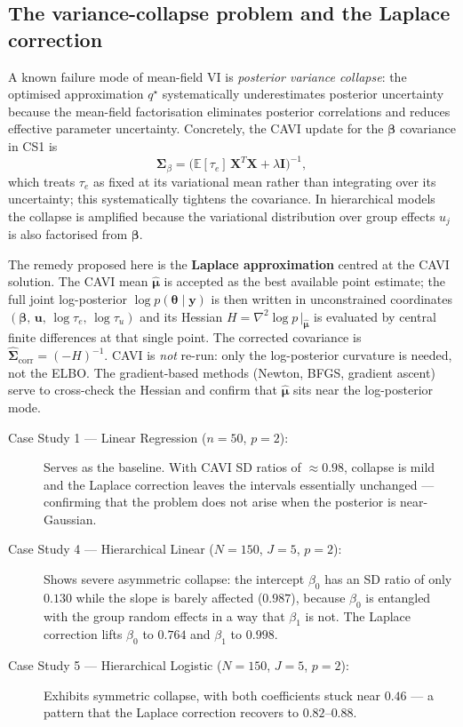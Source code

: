\documentclass[11pt,a4paper]{article}
\newcommand{\E}{\mathbb{E}}
\begin{document}
\subsection*{The variance-collapse problem and the Laplace correction}

A known failure mode of mean-field VI is \emph{posterior variance collapse}: the
optimised approximation $q^\star$ systematically underestimates posterior uncertainty
because the mean-field factorisation eliminates posterior correlations and reduces
effective parameter uncertainty.
Concretely, the CAVI update for the $\bm{\beta}$ covariance in CS1 is
\begin{equation*}
  \bm{\Sigma}_\beta = \bigl(\E[\tau_e]\,\bm{X}^T\bm{X} + \lambda\bm{I}\bigr)^{-1},
\end{equation*}
which treats $\tau_e$ as fixed at its variational mean rather than integrating over its
uncertainty; this systematically tightens the covariance.
In hierarchical models the collapse is amplified because the variational distribution
over group effects $u_j$ is also factorised from $\bm{\beta}$.

The remedy proposed here is the \textbf{Laplace approximation} centred at the CAVI
solution.
The CAVI mean $\hat{\bm{\mu}}$ is accepted as the best available point estimate; the
full joint log-posterior $\log p(\bm{\theta}\mid\bm{y})$ is then written in unconstrained
coordinates $(\bm{\beta},\,\mathbf{u},\,\log\tau_e,\,\log\tau_u)$ and its Hessian
$H = \nabla^2\log p\,\big|_{\hat{\bm{\mu}}}$ is evaluated by central finite differences
at that single point.
The corrected covariance is $\hat{\bm{\Sigma}}_{\mathrm{corr}} = (-H)^{-1}$.
CAVI is \emph{not} re-run: only the log-posterior curvature is needed, not the ELBO.
The gradient-based methods (Newton, BFGS, gradient ascent) serve to cross-check the
Hessian and confirm that $\hat{\bm{\mu}}$ sits near the log-posterior mode.

\begin{description}
  \item[Case Study 1 --- Linear Regression ($n=50$, $p=2$):]
    Serves as the baseline.
    With CAVI SD ratios of $\approx 0.98$, collapse is mild and the Laplace correction
    leaves the intervals essentially unchanged --- confirming that the problem does not
    arise when the posterior is near-Gaussian.
  \item[Case Study 4 --- Hierarchical Linear ($N=150$, $J=5$, $p=2$):]
    Shows severe asymmetric collapse: the intercept $\beta_0$ has an SD ratio of only
    $0.130$ while the slope is barely affected ($0.987$), because $\beta_0$ is entangled
    with the group random effects in a way that $\beta_1$ is not.
    The Laplace correction lifts $\beta_0$ to $0.764$ and $\beta_1$ to $0.998$.
  \item[Case Study 5 --- Hierarchical Logistic ($N=150$, $J=5$, $p=2$):]
    Exhibits symmetric collapse, with both coefficients stuck near $0.46$ --- a pattern
    that the Laplace correction recovers to $0.82$--$0.88$.
\end{description}
\end{document}
